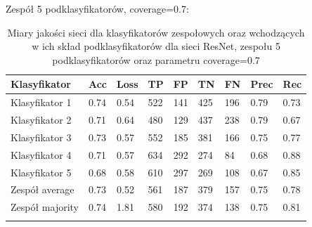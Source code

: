 \documentclass[polish,12pt]{aghthesis}
\begin{document}
\vspace{4mm}
\noindent Zespół 5 podklasyfikatorów, coverage=0.7:
\renewcommand{\arraystretch}{1.75}
 \begin{longtable}[h!]{|m{2.6cm}|m{1.2cm}|m{1.2cm}|m{1.2cm}|m{1.2cm}|m{1.2cm}|m{1.2cm}|m{1.2cm}|m{1.2cm}|}
 \hline
 Klasyfikator & Acc & Loss & TP & FP & TN & FN & Prec & Rec\\
 \hline
 Klasyfikator 1 & 0.74 & 0.54 & 522 & 141 & 425 & 196 & 0.79 & 0.73\\
 \hline
 Klasyfikator 2 & 0.71 & 0.64 & 480 & 129 & 437 & 238 & 0.79 & 0.67\\
 \hline
 Klasyfikator 3 & 0.73 & 0.57 & 552 & 185 & 381 & 166 & 0.75 & 0.77\\
 \hline
 Klasyfikator 4 & 0.71 & 0.57 & 634 & 292 & 274 & 84 & 0.68 & 0.88\\
 \hline
 Klasyfikator 5 & 0.68 & 0.58 & 610 & 297 & 269 & 108 & 0.67 & 0.85\\
 \hline
 Zespół average & 0.73 & 0.52 & 561 & 187 & 379 & 157 & 0.75 & 0.78\\ 
 \hline
 Zespół \newline majority & 0.74 & 1.81 & 580 & 192 & 374 & 138 & 0.75 & 0.81\\
 \hline
\caption{Miary jakości sieci dla klasyfikatorów zespołowych oraz wchodzących w ich skład podklasyfikatorów dla sieci ResNet, zespołu 5 podklasyfikatorów oraz parametru coverage=0.7}
\label{table:22}
\end{longtable}
\end{document}

